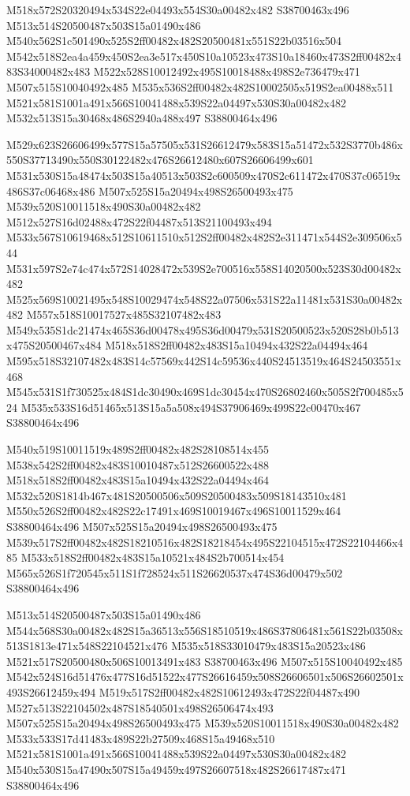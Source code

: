 \documentclass{article}
\begin{document}
\begin{multicols}{2}
M518x572S20320494x534S22e04493x554S30a00482x482 S38700463x496 M513x514S20500487x503S15a01490x486 M540x562S1c501490x525S2ff00482x482S20500481x551S22b03516x504 M542x518S2ea4a459x450S2ea3e517x450S10a10523x473S10a18460x473S2ff00482x483S34000482x483 M522x528S10012492x495S10018488x498S2e736479x471 M507x515S10040492x485 M535x536S2ff00482x482S10002505x519S2ea00488x511 M521x581S1001a491x566S10041488x539S22a04497x530S30a00482x482 M532x513S15a30468x486S2940a488x497 S38800464x496

M529x623S26606499x577S15a57505x531S26612479x583S15a51472x532S3770b486x550S37713490x550S30122482x476S26612480x607S26606499x601 M531x530S15a48474x503S15a40513x503S2c600509x470S2c611472x470S37c06519x486S37c06468x486 M507x525S15a20494x498S26500493x475 M539x520S10011518x490S30a00482x482 M512x527S16d02488x472S22f04487x513S21100493x494 M533x567S10619468x512S10611510x512S2ff00482x482S2e311471x544S2e309506x544 M531x597S2e74c474x572S14028472x539S2e700516x558S14020500x523S30d00482x482 M525x569S10021495x548S10029474x548S22a07506x531S22a11481x531S30a00482x482 M557x518S10017527x485S32107482x483 M549x535S1dc21474x465S36d00478x495S36d00479x531S20500523x520S28b0b513x475S20500467x484 M518x518S2ff00482x483S15a10494x432S22a04494x464 M595x518S32107482x483S14c57569x442S14c59536x440S24513519x464S24503551x468 M545x531S1f730525x484S1dc30490x469S1dc30454x470S26802460x505S2f700485x524 M535x533S16d51465x513S15a5a508x494S37906469x499S22c00470x467 S38800464x496

M540x519S10011519x489S2ff00482x482S28108514x455 M538x542S2ff00482x483S10010487x512S26600522x488 M518x518S2ff00482x483S15a10494x432S22a04494x464 M532x520S1814b467x481S20500506x509S20500483x509S18143510x481 M550x526S2ff00482x482S22c17491x469S10019467x496S10011529x464 S38800464x496 M507x525S15a20494x498S26500493x475 M539x517S2ff00482x482S18210516x482S18218454x495S22104515x472S22104466x485 M533x518S2ff00482x483S15a10521x484S2b700514x454 M565x526S1f720545x511S1f728524x511S26620537x474S36d00479x502 S38800464x496

M513x514S20500487x503S15a01490x486 M544x568S30a00482x482S15a36513x556S18510519x486S37806481x561S22b03508x513S1813e471x548S22104521x476 M535x518S33010479x483S15a20523x486 M521x517S20500480x506S10013491x483 S38700463x496 M507x515S10040492x485 M542x524S16d51476x477S16d51522x477S26616459x508S26606501x506S26602501x493S26612459x494 M519x517S2ff00482x482S10612493x472S22f04487x490 M527x513S22104502x487S18540501x498S26506474x493 M507x525S15a20494x498S26500493x475 M539x520S10011518x490S30a00482x482 M533x533S17d41483x489S22b27509x468S15a49468x510 M521x581S1001a491x566S10041488x539S22a04497x530S30a00482x482 M540x530S15a47490x507S15a49459x497S26607518x482S26617487x471 S38800464x496


\end{multicols}
\end{document}
